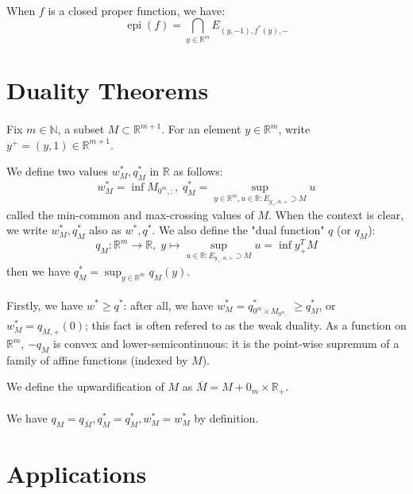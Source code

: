 \paragraph{}When $f$ is a closed proper function, we have:
\[
	\operatorname{epi}(f)=\bigcap_{y\in \mathbb{R}^m}E_{(y,-1),f^\ast(y),-}
\]

\section{Duality Theorems}
\paragraph{}Fix $m\in \mathbb{N}$, a subset $M\subset \mathbb{R}^{m+1}$. For an element $y\in \mathbb{R}^m$, write $y^+=(y,1)\in \mathbb{R}^{m+1}$.

\begin{defn}\label{defn:031-mc-mc}
	We define two values $w^\ast_M, q^\ast_M$ in $\mathbb{R}$ as follows:
	\[
		w^\ast_M = \operatorname{inf}M_{0^m,:},\;
		q^\ast_M = \sup_{y\in \mathbb{R}^m, u\in \mathbb{R}:E_{y_+,u,+}\supset M}u
	\]
	called the min-common and max-crossing values of $M$. When the context is clear, we write $w^\ast_{M},q^\ast_{M}$ also as $w^\ast,q^\ast$. We also define the "dual function" $q$ (or $q_{M}$):
	\[
		q_{M}:\mathbb{R}^m\to \mathbb{R},\; y \mapsto \sup_{u\in \mathbb{R}:E_{y_+,u,+}\supset M}u = \inf y_+^TM
	\]
	then we have $q_{M}^\ast=\sup_{y\in \mathbb{R}^m}q_{M}(y)$.
\end{defn}

\paragraph{}Firstly, we have $w^\ast\geq q^\ast$: after all, we have $w^{\ast}_M=q_{0^m\times M_{0^m,:}}^\ast\geq q_{M}^\ast$, or $w_{M}^\ast=q_{M,+}(0)$; this fact is often refered to as the weak duality. As a function on $\mathbb{R}^m$, $-q_{M}$ is convex and lower-semicontinuous: it is the point-wise supremum of a family of affine functions (indexed by $M$).

\begin{defn}[Upwardification]\label{defn:031-upwardification}
	We define the upwardification of $M$ as $\overline{M}=M+0_m\times \mathbb{R}_+$.
\end{defn}

\paragraph{}We have $q_{M}=q_{\overline{M}},q^\ast_M=q^\ast_M,w^\ast_M=w^\ast_M$ by definition.


\section{Applications}
